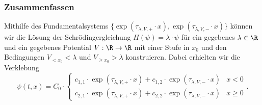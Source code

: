 \documentclass{subfiles}
\begin{document}
    \subsubsection*{Zusammenfassen}
        Mithilfe des Fundamentalsystems $\{\exp(\tau_{\lambda,V,+}\cdot x),\exp(\tau_{\lambda,V,-}\cdot x)\}$ können wir die Lösung der Schrödingergleichung $H(\psi) = \lambda\cdot\psi$ für ein gegebenes $\lambda\in\R$ und ein gegebenes Potential $V:\R\to\R$ mit einer Stufe in $x_0$ und den Bedingungen $V_{<x_0}<\lambda$ und $V_{\geq x_0}>\lambda$ konstruieren. Dabei erhielten wir die Verklebung
        \[
            \psi(t,x) = C_0\cdot\begin{cases}
                c_{1,1}\cdot\exp(\tau_{\lambda,V,+}\cdot x) + c_{1,2}\cdot\exp(\tau_{\lambda,V,-}\cdot x) & x < 0 \\
                c_{2,1}\cdot\exp(\tau_{\lambda,V,+}\cdot x) + c_{2,2}\cdot\exp(\tau_{\lambda,V,-}\cdot x) & x\geq 0
            \end{cases}.
        \]
\end{document}
